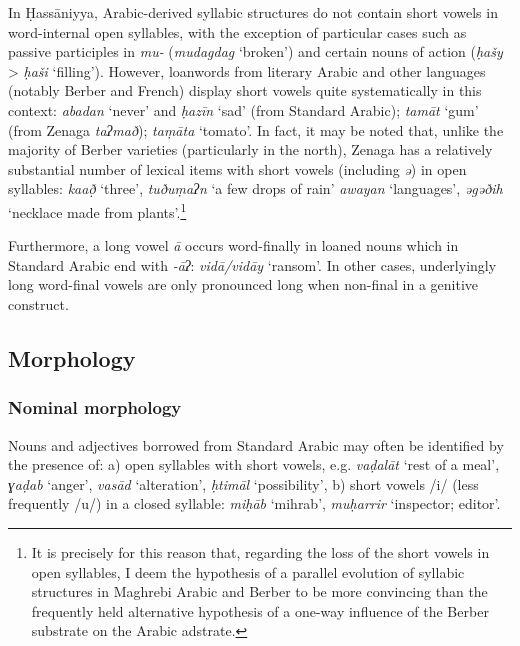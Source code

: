 \documentclass[output=paper]{langsci/langscibook}
\begin{document}
In Ḥassāniyya, Arabic-derived syllabic structures do not contain short vowels in word-internal open syllables, with the exception of particular cases such as passive participles in \textit{mu-} (\textit{mudagdag} ‘broken’) and certain nouns of action (\textit{ḥašy} > \textit{ḥaši} ‘filling’). However, loanwords from literary Arabic and other languages (notably Berber and French) display short vowels quite systematically in this context: \textit{abadan} ‘never’ and \textit{ḥazīn} ‘sad’ (from Standard Arabic); \textit{tamāt} ‘gum’ (from Zenaga \textit{taʔmað}); \textit{taṃāta} ‘tomato’. In fact, it may be noted that, unlike the majority of Berber varieties (particularly in the north), Zenaga has a relatively substantial number of lexical items with short vowels (including \textit{ə}) in open syllables: \textit{ka{\R}að̣} ‘three’, \textit{tuðu}\textit{ṃaʔn} ‘a few drops of rain’ \textit{awayan} ‘languages’, \textit{əgəðih} ‘necklace made from plants'.\footnote{It is precisely for this reason that, regarding the loss of the short vowels in open syllables, I deem the hypothesis of a parallel evolution of syllabic structures in Maghrebi Arabic and Berber to be more convincing than the frequently held alternative hypothesis of a one-way influence of the Berber substrate on the Arabic adstrate.} 

Furthermore, a long vowel \textit{ā} occurs word-finally in loaned nouns which in Standard Arabic end with \textit{{}-āʔ}: \textit{vidā/vidāy} ‘ransom’. In other cases, underlyingly long word-final vowels are only pronounced long when non-final in a genitive construct.

\subsection{Morphology} %

\subsubsection{Nominal morphology} %


Nouns and adjectives borrowed from Standard Arabic may often be identified by the presence of: a) open syllables with short vowels, e.g. \textit{vaḍa}\textit{lāt} ‘rest of a meal’, \textit{ɣaḍab} ‘anger’, \textit{vasād} ‘alteration’, \textit{ḥtimāl} ‘possibility’, b) short vowels /i/ (less frequently /u/) in a closed syllable: \textit{miḥ{\R}āb} ‘mihrab’, \textit{muḥarrir} ‘inspector; editor’.
\end{document}
